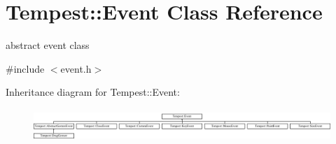 \hypertarget{class_tempest_1_1_event}{\section{Tempest\+:\+:Event Class Reference}
\label{class_tempest_1_1_event}
}


abstract event class  




{\ttfamily \#include $<$event.\+h$>$}

Inheritance diagram for Tempest\+:\+:Event\+:\begin{figure}[H]
\begin{center}
\leavevmode
\includegraphics[height=1.230769cm]{class_tempest_1_1_event}
\end{center}
\end{figure}
